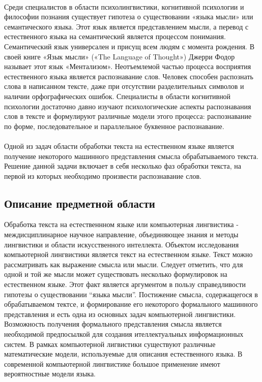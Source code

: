 \paragraph{}
Среди специалистов в области психолингвистики, когнитивной психологии и философии познания существует гипотеза о существовании  «языка мысли» или семантического языка. Этот язык является представлением мысли, а перевод с естественного языка на семантический является процессом понимания. Семантический язык универсален и присущ всем людям с момента рождения. В своей книге «Язык мысли» («The Language of Thought»\cite{fodor}) Джерри Фодор называет этот язык «Ментализом». Неотъемлемой частью процесса восприятия естественного языка является распознавание слов. Человек способен распознать слова в написанном тексте, даже при отсутствии разделительных символов и наличии орфографических ошибок. Специалисты в области когнитивной психологии достаточно давно изучают психологические аспекты распознавания слов в тексте и формулируют различные модели этого процесса: распознавание по форме, последовательное и параллельное буквенное распознавание\cite{larson}. 
\paragraph{}
Одной из задач области обработки текста на естественном языке является получение некоторого машинного представления смысла обрабатываемого текста. Решение данной задачи включает в себя несколько фаз обработки текста, на первой из которых необходимо произвести распознавание слов.

\newpage
\subsection{Описание предметной области}
Обработка текста на естественнном языке или компьютерная лингвистика - междисциплинарное научное направление, объединяющее знания и методы лингвистики и области искусственного интеллекта. Объектом исследования компьютерной лингвистики является текст на естественном языке. Текст можно рассматривать как выражение смысла или мысли. Следует отметить, что для одной и той же мысли может существовать несколько формулировок на естественном языке. Этот факт является аргументом в пользу справедливости гипотезы о существовании “языка мысли”. Постижение смысла, содержащегося в обрабатываемом тектсе, и формирование его некоторого формального машинного представления и есть одна из основных задач компьютерной лингвистики. Возможность получения формального представления смысла является необходимой предпосылкой для создания ителлектуальных информационных систем. В рамках компьютерной лигвистики существуют различные математические модели, используемые для описания естественного языка. В современной компьютерной лингвистике большое применение имеют вероятностные модели языка.

